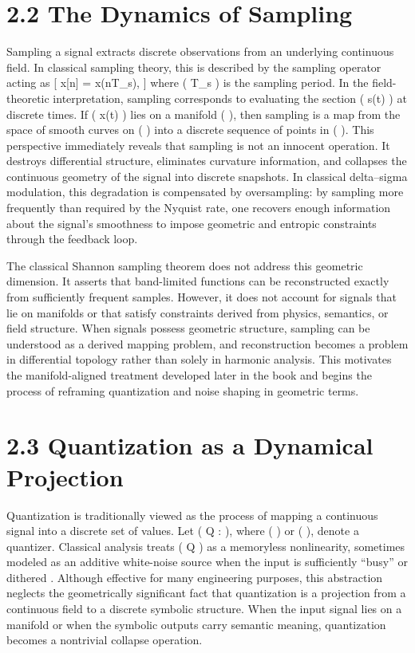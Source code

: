 \section*{2.2 The Dynamics of Sampling}

Sampling a signal extracts discrete observations from an underlying continuous field. In classical sampling theory, this is described by the sampling operator acting as
[
x[n] = x(nT_s),
]
where ( T_s ) is the sampling period. In the field-theoretic interpretation, sampling corresponds to evaluating the section ( s(t) ) at discrete times. If ( x(t) ) lies on a manifold (  ), then sampling is a map from the space of smooth curves on (  ) into a discrete sequence of points in (  ). This perspective immediately reveals that sampling is not an innocent operation. It destroys differential structure, eliminates curvature information, and collapses the continuous geometry of the signal into discrete snapshots. In classical delta--sigma modulation, this degradation is compensated by oversampling: by sampling more frequently than required by the Nyquist rate, one recovers enough information about the signal’s smoothness to impose geometric and entropic constraints through the feedback loop.

The classical Shannon sampling theorem does not address this geometric dimension. It asserts that band-limited functions can be reconstructed exactly from sufficiently frequent samples. However, it does not account for signals that lie on manifolds or that satisfy constraints derived from physics, semantics, or field structure. When signals possess geometric structure, sampling can be understood as a derived mapping problem, and reconstruction becomes a problem in differential topology rather than solely in harmonic analysis. This motivates the manifold-aligned treatment developed later in the book and begins the process of reframing quantization and noise shaping in geometric terms.

\section*{2.3 Quantization as a Dynamical Projection}

Quantization is traditionally viewed as the process of mapping a continuous signal into a discrete set of values. Let ( Q :  \to \Lambda ), where ( \Lambda \subset {} ) or ( \Lambda \subset {} ), denote a quantizer. Classical analysis treats ( Q ) as a memoryless nonlinearity, sometimes modeled as an additive white-noise source when the input is sufficiently ``busy'' or dithered \citep{widrow1956statistical}. Although effective for many engineering purposes, this abstraction neglects the geometrically significant fact that quantization is a projection from a continuous field to a discrete symbolic structure. When the input signal lies on a manifold or when the symbolic outputs carry semantic meaning, quantization becomes a nontrivial collapse operation.

